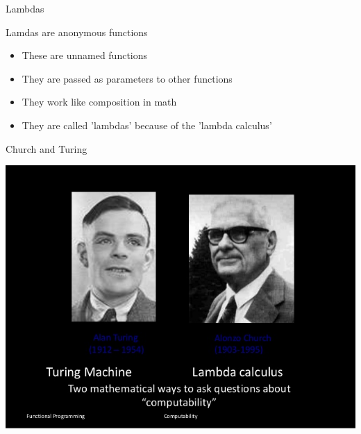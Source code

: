 \documentclass[presetation]{beamer}
\begin{document}
\begin{frame}[label={sec:orgc694baa}]{Lambdas}
\begin{block}{Lamdas are anonymous functions}
\begin{itemize}
\item These are unnamed functions
\item They are passed as parameters to other functions
\item They work like composition in math
\item They are called 'lambdas' because of the 'lambda calculus'
\end{itemize}
\end{block}
\end{frame}

\begin{frame}[label={sec:org93e2729}]{Church and Turing}
\begin{center}
\includegraphics[width=.9\linewidth]{images/computability.jpg}
\end{center}
\end{frame}
\end{document}
